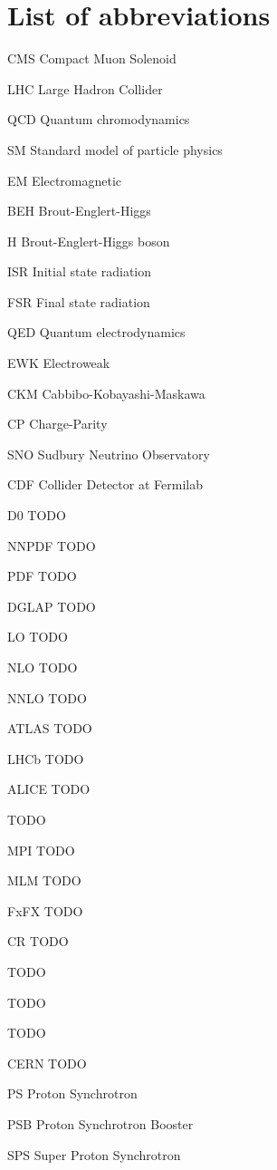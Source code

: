 \chapter*{List of abbreviations}
\begin{abbreviations}
\item[CMS] Compact Muon Solenoid
\item[LHC] Large Hadron Collider
\item[QCD] Quantum chromodynamics
\item[SM] Standard model of particle physics
\item[EM] Electromagnetic
\item[BEH] Brout-Englert-Higgs
\item[H] Brout-Englert-Higgs boson
\item[ISR] Initial state radiation
\item[FSR] Final state radiation
\item[QED] Quantum electrodynamics
\item[EWK] Electroweak
\item[CKM] Cabbibo-Kobayashi-Maskawa
\item[CP] Charge-Parity
\item[SNO] Sudbury Neutrino Observatory
\item[CDF] Collider Detector at Fermilab
\item[D0] TODO
\item[NNPDF] TODO
\item[PDF] TODO
\item[DGLAP] TODO
\item[LO] TODO
\item[NLO] TODO
\item[NNLO] TODO
\item[ATLAS] TODO
\item[LHCb] TODO
\item[ALICE] TODO
\item[\powheg] TODO
\item[MPI] TODO
\item[MLM] TODO
\item[FxFX] TODO
\item[CR] TODO
\item[\GEANT] TODO
\item[\tune] TODO
\item[\oldtune] TODO
\item[CERN] TODO
\item[PS] Proton Synchrotron
\item[PSB] Proton Synchrotron Booster
\item[SPS] Super Proton Synchrotron

\end{abbreviations}
